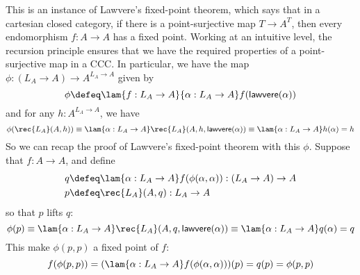  \soln
This is an instance of Lawvere's fixed-point theorem, which says that in a
cartesian closed category, if there is a point-surjective map $T \to A^{T}$,
then every endomorphism $f : A \to A$ has a fixed point.  Working at an
intuitive level, the recursion principle ensures that we have the required
properties of a point-surjective map in a CCC.  In particular, we have the map
$\phi : (L_{A} \to A) \to A^{L_{A} \to A}$ given by
\[
  \phi \defeq 
  \lam{f : L_{A} \to A}{\alpha : L_{A} \to A}f(\mathsf{lawvere}(\alpha))
\]
and for any $h : A^{L_{A} \to A}$, we have
\[
  \phi(\rec{L_{A}}(A, h))
  \equiv
  \lam{\alpha : L_{A} \to A}\rec{L_{A}}(A, h, \mathsf{lawvere}(\alpha))
  \equiv                 
  \lam{\alpha : L_{A} \to A}h(\alpha)
  =
  h
\]
So we can recap the proof of Lawvere's fixed-point theorem with this $\phi$.
Suppose that $f : A \to A$, and define
\begin{align*}
  q &\defeq \lam{\alpha:L_{A} \to A}f(\phi(\alpha, \alpha)) 
     : (L_{A} \to A) \to A \\
  p &\defeq \rec{L_{A}}(A, q) 
     : L_{A} \to A
\end{align*}
so that $p$ lifts $q$:
\[
  \phi(p)
  \equiv
  \lam{\alpha : L_{A} \to A}\rec{L_{A}}(A, q, \mathsf{lawvere}(\alpha))
  \equiv
  \lam{\alpha : L_{A} \to A}q(\alpha)
  =
  q
\]
This make $\phi(p, p)$ a fixed point of $f$:
\[
  f(\phi(p, p))
  = (\lam{\alpha : L_{A} \to A}f(\phi(\alpha, \alpha)))(p) 
  = q(p) 
  = \phi(p, p) 
\]
